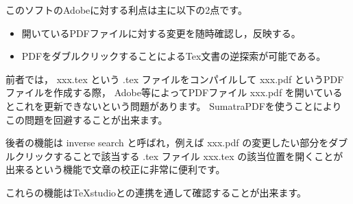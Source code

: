\documentclass[a4paper,10pt,twocolumn,fleqn]{jarticle}
\begin{document}
このソフトのAdobeに対する利点は主に以下の2点です。
\begin{itemize}
	\item 開いているPDFファイルに対する変更を随時確認し，反映する。
	\item PDFをダブルクリックすることによるTex文書の逆探索が可能である。
\end{itemize}
前者では， xxx.tex という .tex ファイルをコンパイルして xxx.pdf というPDFファイルを作成する際，
Adobe等によってPDFファイル xxx.pdf を開いているとこれを更新できないという問題があります。
SumatraPDFを使うことによりこの問題を回避することが出来ます。

後者の機能は inverse search と呼ばれ，例えば xxx.pdf の変更したい部分をダブルクリックすることで該当する .tex ファイル xxx.tex の該当位置を開くことが出来るという機能で文章の校正に非常に便利です。

これらの機能はTeXstudioとの連携を通して確認することが出来ます。
\end{document}
